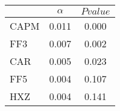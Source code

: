 \begin{tabular}{lcc}
\toprule
 & $\alpha$ & $Pvalue$ \\
\midrule
CAPM & 0.011 & 0.000 \\
FF3 & 0.007 & 0.002 \\
CAR & 0.005 & 0.023 \\
FF5 & 0.004 & 0.107 \\
HXZ & 0.004 & 0.141 \\
\bottomrule
\end{tabular}
